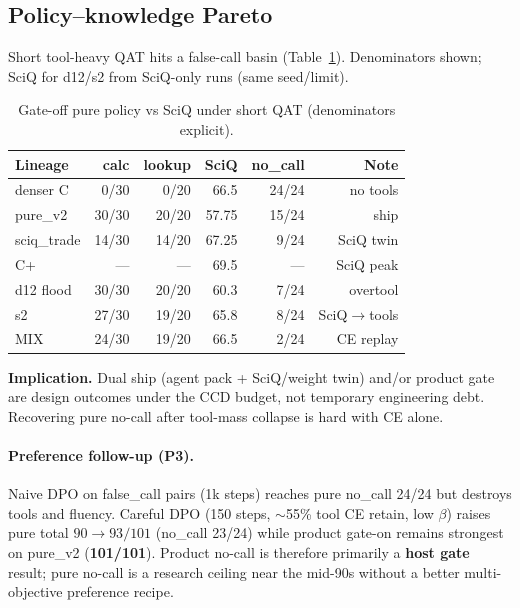 \documentclass[11pt,a4paper]{article}
\begin{document}
\subsection{Policy--knowledge Pareto}
\label{sec:pareto}

Short tool-heavy QAT hits a false-call basin (Table~\ref{tab:pareto}).
Denominators shown; SciQ for d12/s2 from SciQ-only runs (same seed/limit).

\begin{table}[ht]
\centering
\caption{Gate-off pure policy vs SciQ under short QAT (denominators explicit).}
\label{tab:pareto}
\setlength{\tabcolsep}{3pt}
\begin{tabular}{@{}lrrrrr@{}}
\toprule
Lineage & calc & lookup & SciQ & no\_call & Note \\
\midrule
denser C & 0/30 & 0/20 & 66.5 & 24/24 & no tools \\
pure\_v2 & 30/30 & 20/20 & 57.75 & 15/24 & ship \\
sciq\_trade & 14/30 & 14/20 & 67.25 & 9/24 & SciQ twin \\
C+ & --- & --- & 69.5 & --- & SciQ peak \\
d12 flood & 30/30 & 20/20 & 60.3 & 7/24 & overtool \\
s2 & 27/30 & 19/20 & 65.8 & 8/24 & SciQ$\to$tools \\
MIX & 24/30 & 19/20 & 66.5 & 2/24 & CE replay \\
\bottomrule
\end{tabular}
\end{table}

\noindent\textbf{Implication.}
Dual ship (agent pack + SciQ/weight twin) and/or product gate are design outcomes under the CCD budget, not temporary engineering debt.
Recovering pure no-call after tool-mass collapse is hard with CE alone.

\paragraph{Preference follow-up (P3).}
Naive DPO on false\_call pairs (1k steps) reaches pure no\_call 24/24 but destroys tools and fluency.
Careful DPO (150 steps, $\sim$55\% tool CE retain, low $\beta$) raises pure total $90{\to}93/101$ (no\_call 23/24) while product gate-on remains strongest on pure\_v2 (\textbf{101/101}).
Product no-call is therefore primarily a \textbf{host gate} result; pure no-call is a research ceiling near the mid-90s without a better multi-objective preference recipe.
\end{document}
